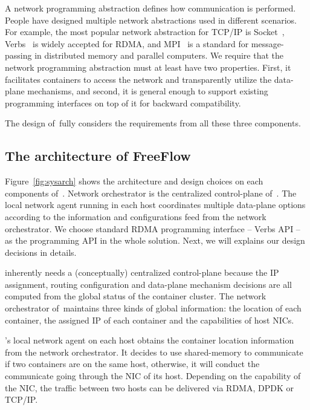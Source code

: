 A network programming abstraction defines how communication is performed.
People have designed multiple network abstractions used in different scenarios.
For example, the most popular network abstraction for TCP/IP is Socket~\cite{?},
Verbs~\cite{?} is widely accepted for RDMA, and MPI~\cite{?} is a standard for
message-passing in distributed memory and parallel computers. We require that
the network programming abstraction must at least have two
properties. First, it facilitates containers to access the network and 
transparently utilize the data-plane mechanisms, and second, it is general 
enough to support existing programming interfaces on top of it for backward 
compatibility.

The design of~\sysname fully considers the requirements from all these three
components.

\subsection{The architecture of FreeFlow}

Figure~\ref{fig:sysarch} shows the architecture and design choices on each 
components of~\sysname. Network orchestrator is the centralized control-plane
of~\sysname. The local network agent running in each host coordinates
multiple data-plane options according to the information and configurations feed
from the network orchestrator. We choose standard RDMA programming interface --
Verbs API -- as the programming API in the whole solution. Next, we will explains
our design decisions in details. 

 \sysname inherently needs a (conceptually)
centralized control-plane because the IP assignment, routing configuration and 
data-plane mechanism decisions are all computed from the global status of the
container cluster. The network orchestrator of~\sysname maintains three kinds
of global information: the location of each container, the assigned IP of each
container and the capabilities of host NICs.

 \sysname's local network agent on each host 
obtains the container location information from the network orchestrator. 
It decides to use shared-memory to communicate if two containers are on the
same host, otherwise, it will conduct the communicate going through 
the NIC of its host. Depending on the capability of the NIC, the traffic 
between two hosts can be delivered via RDMA, DPDK or TCP/IP.

